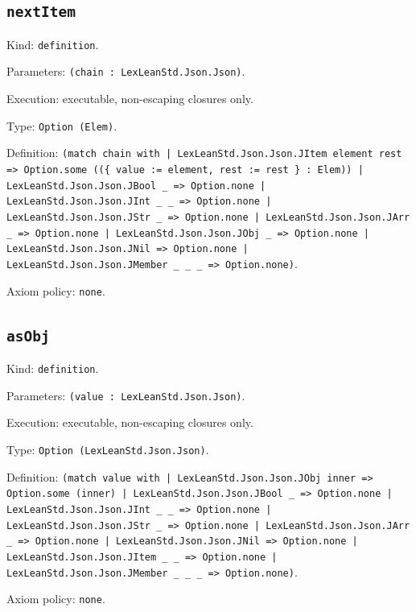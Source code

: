 \documentclass[11pt]{article}
\begin{document}
\subsection*{\texttt{nextItem}}
\noindent Kind: \texttt{definition}.\par
\noindent Parameters: \texttt{(chain : LexLeanStd.Json.Json)}.\par
\noindent Execution: executable, non-escaping closures only.\par
\noindent Type: \texttt{Option (Elem)}.\par
\noindent Definition: \texttt{(match chain with | LexLeanStd.Json.Json.JItem element rest => Option.some ((\{ value := element, rest := rest \} : Elem)) | LexLeanStd.Json.Json.JBool \_ => Option.none | LexLeanStd.Json.Json.JInt \_ \_ => Option.none | LexLeanStd.Json.Json.JStr \_ => Option.none | LexLeanStd.Json.Json.JArr \_ => Option.none | LexLeanStd.Json.Json.JObj \_ => Option.none | LexLeanStd.Json.Json.JNil => Option.none | LexLeanStd.Json.Json.JMember \_ \_ \_ => Option.none)}.\par
\noindent Axiom policy: \texttt{none}.\par
\subsection*{\texttt{asObj}}
\noindent Kind: \texttt{definition}.\par
\noindent Parameters: \texttt{(value : LexLeanStd.Json.Json)}.\par
\noindent Execution: executable, non-escaping closures only.\par
\noindent Type: \texttt{Option (LexLeanStd.Json.Json)}.\par
\noindent Definition: \texttt{(match value with | LexLeanStd.Json.Json.JObj inner => Option.some (inner) | LexLeanStd.Json.Json.JBool \_ => Option.none | LexLeanStd.Json.Json.JInt \_ \_ => Option.none | LexLeanStd.Json.Json.JStr \_ => Option.none | LexLeanStd.Json.Json.JArr \_ => Option.none | LexLeanStd.Json.Json.JNil => Option.none | LexLeanStd.Json.Json.JItem \_ \_ => Option.none | LexLeanStd.Json.Json.JMember \_ \_ \_ => Option.none)}.\par
\noindent Axiom policy: \texttt{none}.\par
\end{document}
